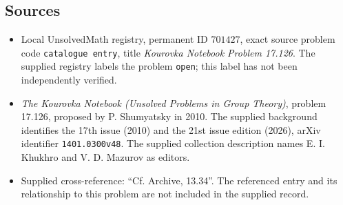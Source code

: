 \documentclass[11pt]{article}
\begin{document}
\subsection{Sources}
\begin{itemize}
\item Local UnsolvedMath registry, permanent ID \(701427\), exact source problem code \texttt{catalogue entry}, title \emph{Kourovka Notebook Problem 17.126}. The supplied registry labels the problem \texttt{open}; this label has not been independently verified.
\item \emph{The Kourovka Notebook (Unsolved Problems in Group Theory)}, problem 17.126, proposed by P. Shumyatsky in 2010. The supplied background identifies the 17th issue (2010) and the 21st issue edition (2026), arXiv identifier \texttt{1401.0300v48}. The supplied collection description names E. I. Khukhro and V. D. Mazurov as editors.
\item Supplied cross-reference: ``Cf. Archive, 13.34''. The referenced entry and its relationship to this problem are not included in the supplied record.
\end{itemize}
\end{document}
